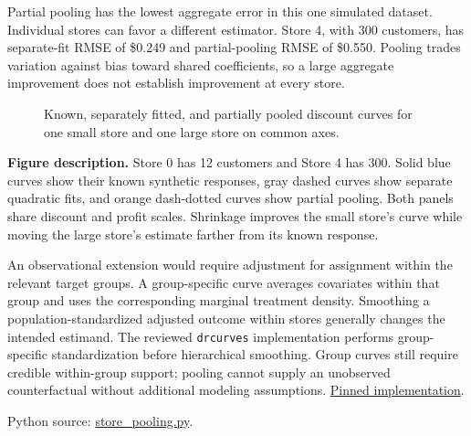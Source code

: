 Partial pooling has the lowest aggregate error in this one simulated
dataset. Individual stores can favor a different estimator. Store 4,
with 300 customers, has separate-fit RMSE of \$0.249 and partial-pooling
RMSE of \$0.550. Pooling trades variation against bias toward shared
coefficients, so a large aggregate improvement does not establish
improvement at every store.

\begin{figure}[htbp]
\centering

\caption{Known, separately fitted, and partially pooled discount curves for one small store and one large store on common axes.}\label{fig:M06_store_pooling}
\end{figure}

\textbf{Figure description.} Store 0 has 12 customers and Store 4 has
300. Solid blue curves show their known synthetic responses, gray dashed
curves show separate quadratic fits, and orange dash-dotted curves show
partial pooling. Both panels share discount and profit scales. Shrinkage
improves the small store's curve while moving the large store's estimate
farther from its known response.

An observational extension would require adjustment for assignment
within the relevant target groups. A group-specific curve averages
covariates within that group and uses the corresponding marginal
treatment density. Smoothing a population-standardized adjusted outcome
within stores generally changes the intended estimand. The reviewed
\texttt{drcurves} implementation performs group-specific standardization
before hierarchical smoothing. Group curves still require credible
within-group support; pooling cannot supply an unobserved counterfactual
without additional modeling assumptions.
\href{https://github.com/raz1470/continuous-dr-learner/blob/72115789652127cc2a89eb960d829d2cc513d9cb/src/drcurves/nuisance.py}{Pinned
implementation}.

\FloatBarrier
{}
Python source:
\href{../03_Data_and_Code/Dose_Response/store_pooling.py}{store\_pooling.py}.

